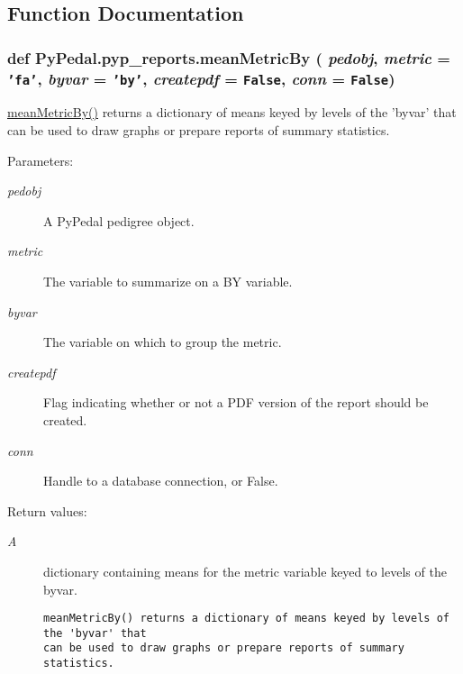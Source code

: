 \subsection{Function Documentation}
\hypertarget{namespacePyPedal_1_1pyp__reports_bdef097ff294848a2a497f5c1dfef623}{
\subsubsection[meanMetricBy]{\setlength{\rightskip}{0pt plus 5cm}def Py\-Pedal.pyp\_\-reports.mean\-Metric\-By ( {\em pedobj},  {\em metric} = {\tt 'fa'},  {\em byvar} = {\tt 'by'},  {\em createpdf} = {\tt False},  {\em conn} = {\tt False})}}
\label{namespacePyPedal_1_1pyp__reports_bdef097ff294848a2a497f5c1dfef623}


\hyperlink{namespacePyPedal_1_1pyp__reports_bdef097ff294848a2a497f5c1dfef623}{mean\-Metric\-By()} returns a dictionary of means keyed by levels of the 'byvar' that can be used to draw graphs or prepare reports of summary statistics. 

\begin{Desc}
\item[Parameters:]
\begin{description}
\item[{\em pedobj}]A Py\-Pedal pedigree object. \item[{\em metric}]The variable to summarize on a BY variable. \item[{\em byvar}]The variable on which to group the metric. \item[{\em createpdf}]Flag indicating whether or not a PDF version of the report should be created. \item[{\em conn}]Handle to a database connection, or False. \end{description}
\end{Desc}
\begin{Desc}
\item[Return values:]
\begin{description}
\item[{\em A}]dictionary containing means for the metric variable keyed to levels of the byvar.

\footnotesize\begin{verbatim}meanMetricBy() returns a dictionary of means keyed by levels of the 'byvar' that
can be used to draw graphs or prepare reports of summary statistics.
\end{verbatim}
\normalsize
 \end{description}
\end{Desc}


